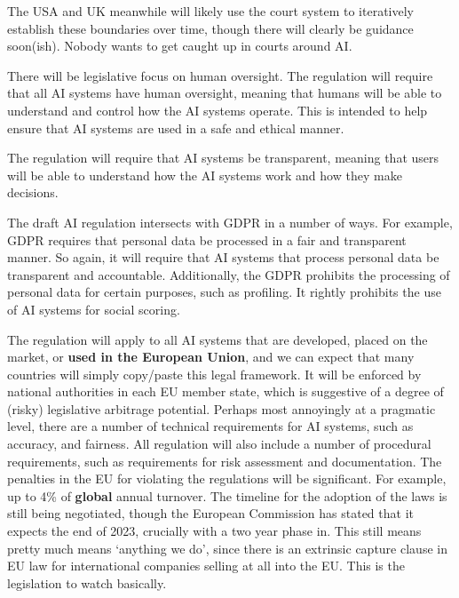 The USA and UK meanwhile will likely use the court system to iteratively establish these boundaries over time, though there will clearly be guidance soon(ish). Nobody wants to get caught up in courts around AI.\par
There will be legislative focus on human oversight. The regulation will require that all AI systems have human oversight, meaning that humans will be able to understand and control how the AI systems operate. This is intended to help ensure that AI systems are used in a safe and ethical manner.\par 
The regulation will require that AI systems be transparent, meaning that users will be able to understand how the AI systems work and how they make decisions.\par
The draft AI regulation intersects with GDPR in a number of ways. For example, GDPR requires that personal data be processed in a fair and transparent manner. So again, it will require that AI systems that process personal data be transparent and accountable. Additionally, the GDPR prohibits the processing of personal data for certain purposes, such as profiling. It rightly prohibits the use of AI systems for social scoring. \par
The regulation will apply to all AI systems that are developed, placed on the market, or \textbf{used in the European Union}, and we can expect that many countries will simply copy/paste this legal framework. It will be enforced by national authorities in each EU member state, which is suggestive of a degree of (risky) legislative arbitrage potential. Perhaps most annoyingly at a pragmatic level, there are a number of technical requirements for AI systems, such as accuracy, and fairness. All regulation will also include a number of procedural requirements, such as requirements for risk assessment and documentation. The penalties in the EU for violating the regulations will be significant. For example, up to 4\% of \textbf{global} annual turnover. The timeline for the adoption of the laws is still being negotiated, though the European Commission has stated that it expects the end of 2023, crucially with a two year phase in. This still means pretty much means `anything we do', since there is an extrinsic capture clause in EU law for international companies selling at all into the EU. This is the legislation to watch basically.\par
